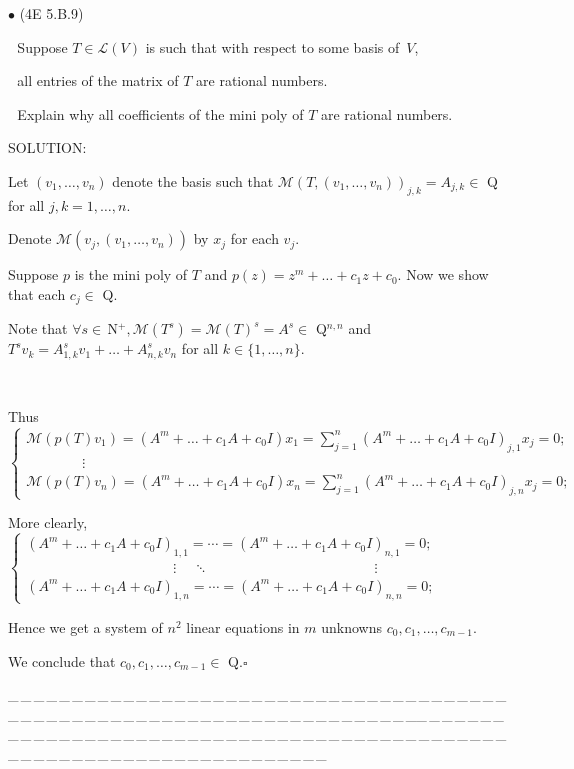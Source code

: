 \documentclass[a4paper, 11pt, UTF8]{article}
\def\Lm{\mathcal{L}}
\def\Mt{\mathcal{M}}
\def\Nbp{$\,{\timesbf N}$^+}
\begin{document}
\begin{large}
{\small $\bullet$} ({\normalsize 4E 5.B.9})\par\,\, {\timessl\Large 
Suppose $T\in\Lm(V)$ is such that with respect to some basis of \,$V$,}\par\,\,
{\timessl\Large all entries of the matrix of $T$ are rational numbers.}\par\,\,
{\timessl\Large Explain why all coefficients of the mini poly of $T$ are rational numbers.
}\par
{\timesbf S\footnotesize{OLUTION:}}\par\quad
Let $(v_1,\dots,v_n)$ denote the basis such that $\Mt(T,(v_1,\dots,v_n))_{j,k}=A_{j,k}\in$ {\timesbf Q} for all $j,k=1,\dots,n$.\par\quad
Denote $\Mt(v_j,(v_1,\dots,v_n))$ by $x_j$ for each $v_j.$\par\quad
Suppose $p$ is the mini poly of $T$ and $p(z)=z^m+\dots+c_1 z+c_0.$ Now we show that each $c_j\in$ {\timesbf Q}.\par\quad
Note that $\forall s\in\Nbp,\Mt(T^s)=\Mt(T)^s=A^s\in$ {\timesbf Q}$^{n,n}$ and $T^s v_k=A^s_{1,k} v_1+\dots+A^s_{n,k}v_n$ for all $k\in\{1,\dots,n\}.$\par{\tiny\,\par}\quad
Thus $\left\{\begin{array}{l}
\Mt(p(T)v_1)=(A^m+\dots+c_1 A+c_0 I)x_1=\sum\limits_{j=1}^n(A^m+\dots+c_1 A+c_0 I)_{j,1}x_j=0;\\ \qquad\qquad\vdots \\
\Mt(p(T)v_n)=(A^m+\dots+c_1 A+c_0 I)x_n=\sum\limits_{j=1}^n(A^m+\dots+c_1 A+c_0 I)_{j,n}x_j=0;
\end{array}\right.$\par\quad
More clearly, $\left\{\begin{array}{l}
(A^m+\dots+c_1 A+c_0 I)_{1,1}=\cdots=(A^m+\dots+c_1 A+c_0 I)_{n,1}=0;\\ \qquad\qquad\qquad\qquad\qquad\,\,\,\vdots\quad\,\ddots\qquad\qquad\qquad\qquad\qquad\quad\,\,\,\,\,\vdots \\
(A^m+\dots+c_1 A+c_0 I)_{1,n}=\cdots=(A^m+\dots+c_1 A+c_0 I)_{n,n}=0;
\end{array}\right.$\par\quad
Hence we get a system of $n^2$ linear equations in $m$ unknowns $c_0,c_1,\dots,c_{m-1}.$\par\quad
We conclude that $c_0,c_1,\dots,c_{m-1}\in$ {\timesbf Q}.\quad$\square$\par
{\tiny \_\,\_\,\_\,\_\,\_\,\_\,\_\,\_\,\_\,\_\,\_\,\_\,\_\,\_\,\_\,\_\,\_\,\_\,\_\,\_\,\_\,\_\,\_\,\_\,\_\,\_\,\_\,\_\,\_\,\_\,\_\,\_\,\_\,\_\,\_\,\_\,\_\,\_\,\_\,\_\,\_\,\_\,\_\,\_\,\_\,\_\,\_\,\_\,\_\,\_\,\_\,\_\,\_\,\_\,\_\,\_\,\_\,\_\,\_\,\_\,\_\,\_\,\_\,\_\,\_\,\_\,\_\,\_\,\_\,\_\,\_\_\,\_\,\_\,\_\,\_\,\_\,\_\,\_\,\_\,\_\,\_\,\_\,\_\,\_\,\_\,\_\,\_\,\_\,\_\,\_\,\_\,\_\,\_\,\_\,\_\,\_\,\_\,\_\,\_\,\_\,\_\,\_\,\_\,\_\,\_\,\_\,\_\,\_\,\_\,\_\,\_\,\_\,\_\,\_\,\_\,\_\,\_\,\_\,\_\,\_\,\_\,\_\,\_\,\_\,\_\,\_\,\_\,\_\,\_\,\_\,\_\,\_\,\_\,\_\,\_\,\_\,\_\,\_\,\_\,\_\,\_}\par


\end{large}
\end{document}
